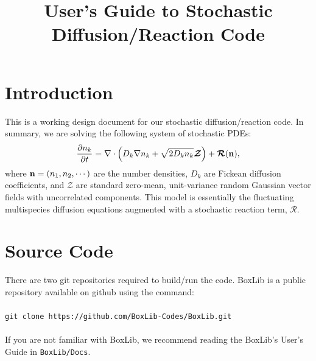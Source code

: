\documentclass[final]{siamltex}
\def\nb  {{\bf n}}
\def\mRb {\bm{\mathcal{R}}}
\def\mZb {\bm{\mathcal{Z}}}
\begin{document}
\title{User's Guide to Stochastic Diffusion/Reaction Code}

\maketitle

\section{Introduction}
This is a working design document for our stochastic diffusion/reaction code.
In summary, we are solving the following system of stochastic PDEs:
\begin{equation}
\frac{\partial n_k}{\partial t} = \nabla\cdot\left(D_k\nabla n_k + \sqrt{2D_kn_k}\mZb\right) + \mRb(\nb),
\end{equation}
where $\nb=(n_1,n_2,\cdots)$ are the number densities, $D_k$ are Fickean diffusion
coefficients, and $\mZb$ are standard zero-mean, unit-variance random Gaussian 
vector fields with uncorrelated components.
This model is essentially the fluctuating multispecies diffusion equations
augmented with a stochastic reaction term, $\mRb$.

\section{Source Code}
There are two git repositories required to build/run the code.  BoxLib is a public
repository available on github using the command:\\ \\
{\tt git clone https://github.com/BoxLib-Codes/BoxLib.git}\\ \\
If you are not familiar with BoxLib, we recommend reading the BoxLib's User's Guide
in {\tt BoxLib/Docs}.\\
\end{document}
